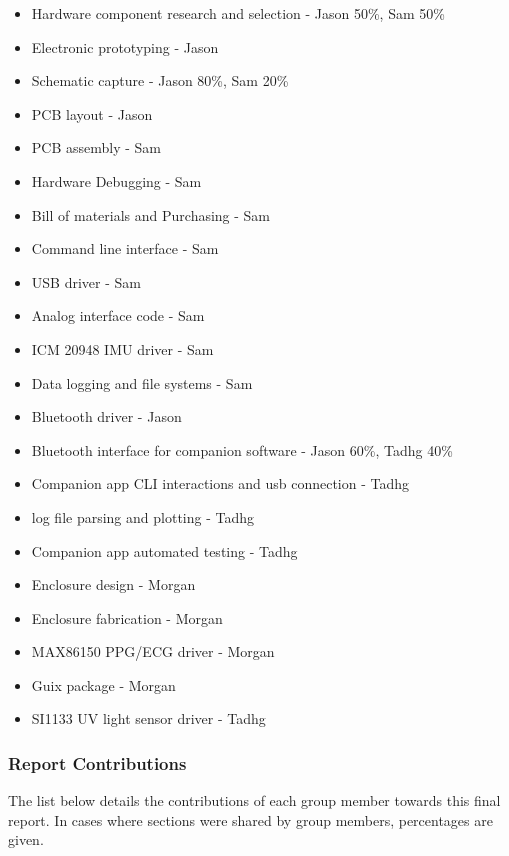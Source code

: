 \begin{itemize}
    \item Hardware component research and selection - Jason 50\%, Sam 50\%
    \item Electronic prototyping - Jason
    \item Schematic capture - Jason 80\%, Sam 20\%
    \item PCB layout - Jason
    \item PCB assembly - Sam
    \item Hardware Debugging - Sam
    \item Bill of materials and Purchasing - Sam
    \item Command line interface - Sam
    \item USB driver - Sam
    \item Analog interface code - Sam
    \item ICM 20948 IMU driver - Sam
    \item Data logging and file systems - Sam
    \item Bluetooth driver - Jason
    \item Bluetooth interface for companion software - Jason 60\%, Tadhg 40\%
    \item Companion app CLI interactions and usb connection - Tadhg
    \item log file parsing and plotting - Tadhg
    \item Companion app automated testing - Tadhg
    \item Enclosure design - Morgan
    \item Enclosure fabrication - Morgan
    \item MAX86150 PPG/ECG driver - Morgan
    \item Guix package - Morgan
    \item SI1133 UV light sensor driver - Tadhg
\end{itemize}

\subsubsection{Report Contributions}
The list below details the contributions of each group member towards this final
report. In cases where sections were shared by group members, percentages are
given.

